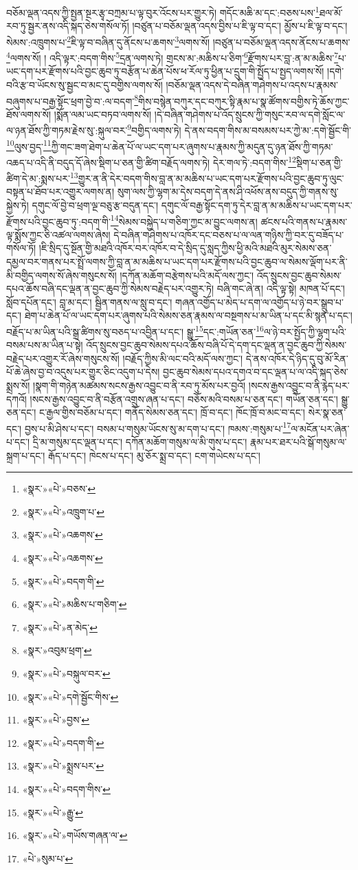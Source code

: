 བཅོམ་ལྡན་འདས་ཀྱི་སྤྱན་སྔར་རྩྭ་བཀྲམ་པ་ལྟ་བུར་འོངས་པར་གྱུར་ཏེ། གདོང་མཆི་མ་དང་:བཅས་པས་\footnote{«སྣར་»«པེ་»བཅས་}ཐལ་མོ་རབ་ཏུ་སྦྱར་ནས་འདི་སྐད་ཅེས་གསོལ་ཏོ། །བཙུན་པ་བཅོམ་ལྡན་འདས་བྱིས་པ་ཇི་ལྟ་བ་དང་། མྱོས་པ་ཇི་ལྟ་བ་དང་། སེམས་:འཁྲུགས་པ་\footnote{«སྣར་»«པེ་»འཁྲུག་པ་}ཇི་ལྟ་བ་བཞིན་དུ་ནོངས་པ་ཆགས་\footnote{«སྣར་»«པེ་»འཆགས་}ལགས་སོ། །བཙུན་པ་བཅོམ་ལྡན་འདས་ནོངས་པ་ཆགས་\footnote{«སྣར་»«པེ་»འཆགས་}ལགས་སོ། །
འདི་ལྟར་:བདག་གིས་\footnote{«སྣར་»«པེ་»བདག་གི་}དྲན་ལགས་ཏེ། གྲངས་མ་:མཆིས་པ་ཅིག་\footnote{«སྣར་»«པེ་»མཆིས་པ་གཅིག་}རྫོགས་པར་བླ་:ན་མ་མཆིས་\footnote{«སྣར་»«པེ་»ན་མེད་}པ་ཡང་དག་པར་རྫོགས་པའི་བྱང་ཆུབ་ཏུ་བརྩོན་པ་ཆེན་པོས་ཕ་རོལ་ཏུ་ཕྱིན་པ་དྲུག་གི་སྤྱོད་པ་སྤྱད་ལགས་སོ། །དགེ་བའི་རྩ་བ་ཡོངས་སུ་སྦྱང་བ་མང་དུ་བགྱིས་ལགས་སོ། །བཅོམ་ལྡན་འདས་དེ་བཞིན་གཤེགས་པ་འདས་པ་རྣམས་བཞུགས་པ་བརྒྱ་སྟོང་ཕྲག་བྱེ་བ་:ལ་བདག་\footnote{«སྣར་»འབུམ་ཕྲག་}གིས་བསྙེན་བཀུར་དང་བཀུར་སྟི་རྣམ་པ་སྣ་ཚོགས་བགྱིས་ཏེ་ཆོས་ཀྱང་ཐོས་ལགས་སོ། །སྨོན་ལམ་ཡང་བཏབ་ལགས་སོ། །དེ་བཞིན་གཤེགས་པ་འོད་སྲུངས་ཀྱི་གསུང་རབ་ལ་དགེ་སློང་ལ་ལ་ཉན་ཐོས་ཀྱི་གཏམ་རྗེས་སུ་:སྐུལ་བར་\footnote{«སྣར་»«པེ་»བསྐུལ་བར་}བགྱིད་ལགས་ཏེ། དེ་ནས་བདག་གིས་མ་བསམས་པར་ཀྱེ་མ་:དགེ་སྦྱོང་གི་\footnote{«སྣར་»«པེ་»དགེ་སྦྱོང་གིས་}ལུས་བྱད་\footnote{«སྣར་»«པེ་»བྱས་}ཀྱི་གང་ཟག་ཐེག་པ་ཆེན་པོ་ལ་ཡང་དག་པར་ཞུགས་པ་རྣམས་ཀྱི་མདུན་དུ་ཉན་ཐོས་ཀྱི་གཏམ་འཆད་པ་འདི་ནི་བདུད་དོ་ཞེས་སྡིག་པ་ཅན་གྱི་ཚིག་བརྗོད་ལགས་ཏེ། དེར་གལ་ཏེ་:བདག་གིས་\footnote{«སྣར་»«པེ་»བདག་གི་}སྡིག་པ་ཅན་གྱི་ཚིག་དེ་མ་:སྨས་པར་\footnote{«སྣར་»«པེ་»སྨྲས་པར་}གྱུར་ན་ནི་དེར་བདག་གིས་བླ་ན་མ་མཆིས་པ་ཡང་དག་པར་རྫོགས་པའི་བྱང་ཆུབ་ཏུ་ལུང་བསྟན་པ་ཐོབ་པར་འགྱུར་ལགས་ན། སུག་ལས་ཀྱི་ལྷག་མ་དེས་བདག་དེ་ནས་ཤི་འཕོས་ནས་བདུད་ཀྱི་གནས་སུ་སྐྱེས་ཏེ། དགུང་ལོ་བྱེ་བ་ཕྲག་ལྔ་བཅུ་རྩ་བདུན་དང་། དགུང་ལོ་བརྒྱ་སྟོང་དག་ཏུ་དེར་བླ་ན་མ་མཆིས་པ་ཡང་དག་པར་རྫོགས་པའི་བྱང་ཆུབ་ཏུ་:བདག་གི་\footnote{«སྣར་»«པེ་»བདག་གིས་}སེམས་བསྐྱེད་པ་གཅིག་ཀྱང་མ་བྱུང་ལགས་ན། ཚངས་པའི་གནས་པ་རྣམས་ལྟ་སྨོས་ཀྱང་ཅི་འཚལ་ལགས་ཞེས། དེ་བཞིན་གཤེགས་པ་འཁོར་དང་བཅས་པ་ལ་ལན་གཉིས་ཀྱི་བར་དུ་བཟོད་པ་གསོལ་ཏོ། །ཇི་སྲིད་དུ་སྔོན་གྱི་མཐའི་འཁོར་བར་འཁོར་བ་དེ་སྲིད་དུ་སླད་ཀྱིས་ཕྱི་མའི་མཐའི་མུར་སེམས་ཅན་དམྱལ་བར་གནས་པར་སྤྲོ་ལགས་ཀྱི་བླ་ན་མ་མཆིས་པ་ཡང་དག་པར་རྫོགས་པའི་བྱང་ཆུབ་ལ་སེམས་ལྡོག་པར་ནི་མི་བགྱིད་ལགས་སོ་ཞེས་གསུངས་སོ། །དཀོན་མཆོག་བརྩེགས་པའི་མདོ་ལས་ཀྱང་། འོད་སྲུངས་བྱང་ཆུབ་སེམས་དཔའ་ཆོས་བཞི་དང་ལྡན་ན་བྱང་ཆུབ་ཀྱི་སེམས་བརྗེད་པར་འགྱུར་ཏེ། བཞི་གང་ཞེ་ན། འདི་ལྟ་སྟེ། མཁན་པོ་དང་། སློབ་དཔོན་དང་། བླ་མ་དང་། སྦྱིན་གནས་ལ་སླུ་བ་དང་། གཞན་འགྱོད་པ་མེད་པ་དག་ལ་འགྱོད་པ་ཉེ་བར་སྒྲུབ་པ་དང་། ཐེག་པ་ཆེན་པོ་ལ་ཡང་དག་པར་ཞུགས་པའི་སེམས་ཅན་རྣམས་ལ་བསྔགས་པ་མ་ཡིན་པ་དང་མི་སྙན་པ་དང་། བརྗོད་པ་མ་ཡིན་པའི་སྒྲ་ཚིགས་སུ་བཅད་པ་འབྱིན་པ་དང་། སྒྱུ་\footnote{«སྣར་»«པེ་»རྒྱུ་}དང་:གཡོན་ཅན་\footnote{«སྣར་»«པེ་»གཡོས་གཞན་ལ་}ལ་ཉེ་བར་སྤྱོད་ཀྱི་ལྷག་པའི་བསམ་པས་མ་ཡིན་པ་སྟེ། འོད་སྲུངས་བྱང་ཆུབ་སེམས་དཔའ་ཆོས་བཞི་པོ་དེ་དག་དང་ལྡན་ན་བྱང་ཆུབ་ཀྱི་སེམས་བརྗེད་པར་འགྱུར་རོ་ཞེས་གསུངས་སོ། །བརྗོད་ཀྱིས་མི་ལང་བའི་མདོ་ལས་ཀྱང་། དེ་ནས་འཁོར་དེ་ཉིད་དུ་བུ་མོ་རིན་པོ་ཆེ་ཞེས་བྱ་བ་འདུས་པར་གྱུར་ཅིང་འདུག་པ་དེས། བྱང་ཆུབ་སེམས་དཔའ་དགའ་བ་དང་ལྡན་པ་ལ་འདི་སྐད་ཅེས་སྨྲས་སོ། །སྣག་གི་གཉེན་མཚམས་སངས་རྒྱས་འབྱུང་བ་ནི་རབ་ཏུ་མོས་པར་བྱའོ། །སངས་རྒྱས་འབྱུང་བ་ནི་རྙེད་པར་དཀའོ། །སངས་རྒྱས་འབྱུང་བ་ནི་བརྩོན་འགྲུས་ཞན་པ་དང་། བཅོས་མའི་བསམ་པ་ཅན་དང་། གཡོན་ཅན་དང་། སྒྱུ་ཅན་དང་། ང་རྒྱལ་གྱིས་བཅོམ་པ་དང་། གནོད་སེམས་ཅན་དང་། ཁྲོ་བ་དང་། ཁོང་ཁྲོ་བ་མང་བ་དང་། སེར་སྣ་ཅན་དང་། བྱས་པ་མི་ཤེས་པ་དང་། བསམ་པ་གསུམ་ཡོངས་སུ་མ་དག་པ་དང་། ཁམས་:གསུམ་པ་\footnote{«པེ་»སུམ་པ་}ལ་མངོན་པར་ཞེན་པ་དང་། དྲི་མ་གསུམ་དང་ལྡན་པ་དང་། དཀོན་མཆོག་གསུམ་ལ་མི་གུས་པ་དང་། རྣམ་པར་ཐར་པའི་སྒོ་གསུམ་ལ་སྐྲག་པ་དང་། རྒོད་པ་དང་། ཁེངས་པ་དང་། མུ་ཅོར་སྨྲ་བ་དང་། ངག་གཡེངས་པ་དང་། 
